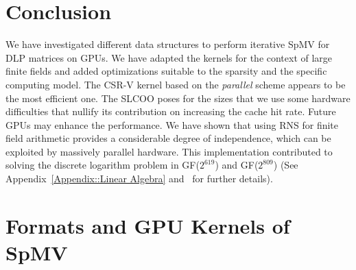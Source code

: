 \documentclass[runningheads,orivec]{llncs}
\begin{document}
\section{Conclusion}
\label{conclusion}
We have investigated different data structures to perform iterative SpMV for DLP matrices on GPUs. We have adapted the kernels for the context of large finite fields and added optimizations suitable to the sparsity and the specific computing model. The CSR-V kernel based on the \textit{parallel} scheme appears to be the most efficient one. The SLCOO poses for the sizes that we use some hardware difficulties that nullify its contribution on increasing the cache hit rate. Future GPUs may enhance the performance. We have shown that using RNS for finite field arithmetic provides a considerable degree of independence, which can be exploited by massively parallel hardware. This implementation contributed to solving the discrete logarithm problem in GF($2^{619}$) and GF($2^{809}$) (See Appendix~\ref{Appendix::Linear Algebra} and~\cite{FFS809,JEL14} for further details). 


\vspace*{-0.25cm}






\vspace*{-0.75cm}

\appendix
\section{Formats and GPU Kernels of SpMV}
\label{Appendix:: kernels}
\end{document}
